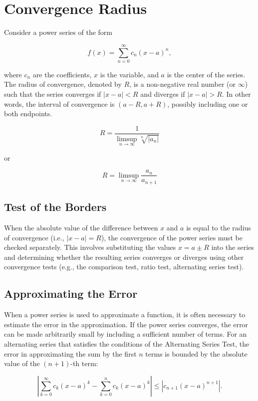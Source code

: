 \newpage
\section{Convergence Radius}

Consider a power series of the form

\[
    f(x) = \sum_{n=0}^{\infty} c_n {(x - a)}^n,
\]

where \(c_n\) are the coefficients, \(x\) is the variable, and \(a\) is the center of the series. 
The radius of convergence, denoted by \(R\), is a non-negative real number (or \(\infty\)) 
such that the series converges if \(|x - a| < R\) and diverges if \(|x - a| > R\). In other words, 
the interval of convergence is \((a - R, a + R)\), possibly including one or both endpoints.

\[
    R = \frac{1}{\limsup_{n \to \infty} \sqrt[n]{|a_n|}}
\]

or 

\[
    R = \limsup_{n \to \infty} \frac{a_n}{ a_{n + 1}}
\]

\subsection{Test of the Borders}

When the absolute value of the difference between \(x\) and \(a\) is equal to the radius of convergence 
(i.e., \(|x - a| = R\)), the convergence of the power series must be checked separately. This involves 
substituting the values \(x = a \pm R\) into the series and determining whether the resulting series 
converges or diverges using other convergence tests (e.g., the comparison test, ratio test, alternating 
series test).

\subsection{Approximating the Error}

When a power series is used to approximate a function, it is often necessary to estimate the error in the 
approximation. If the power series converges, the error can be made arbitrarily small by including a 
sufficient number of terms. For an alternating series that satisfies the conditions of the Alternating 
Series Test, the error in approximating the sum by the first \(n\) terms is bounded by the absolute value 
of the \((n+1)\)-th term:

\[
    \left| \sum_{k=0}^{\infty} c_k {(x - a)}^k - \sum_{k=0}^{n} c_k {(x - a)}^k \right| \leq |c_{n+1} {(x - a)}^{n+1}|.
\]

